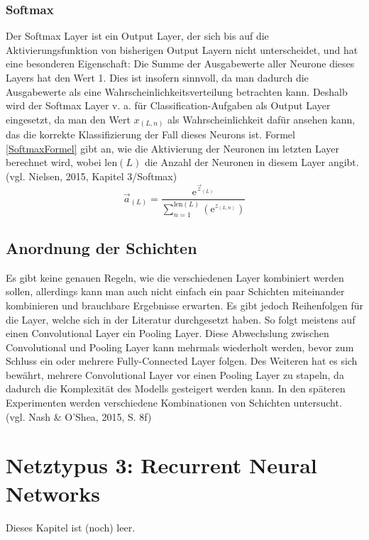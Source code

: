 \documentclass[a4paper,12pt,ngerman,oneside]{scrreprt}	%
\newcommand{\cnnKlein}[1]{(vgl. Nash \& O'Shea, 2015, S. {#1})}
\begin{document}
			\subsection{Softmax}
			Der Softmax Layer ist ein Output Layer, der sich bis auf die Aktivierungsfunktion von bisherigen Output Layern nicht unterscheidet, und hat eine besonderen Eigenschaft: Die Summe der Ausgabewerte aller Neurone dieses Layers hat den Wert 1. Dies ist insofern sinnvoll, da man dadurch die Ausgabewerte als eine Wahrscheinlichkeitsverteilung betrachten kann. Deshalb wird der Softmax Layer v. a. für Classification-Aufgaben als Output Layer eingesetzt, da man den Wert $x_{(L,n)}$ als Wahrscheinlichkeit dafür ansehen kann, das die korrekte Klassifizierung der Fall dieses Neurons ist. Formel \ref{SoftmaxFormel} gibt an, wie die Aktivierung der Neuronen im letzten Layer berechnet wird, wobei $\textrm{len}(L)$ die Anzahl der Neuronen in diesem Layer angibt. (vgl. Nielsen, 2015, Kapitel 3/Softmax)
			\begin{equation}\label{SoftmaxFormel}
				\vec{a}_{(L)} = \frac{ \textrm{e}^{ \vec{z}_{(L)} } }{ \sum\limits_{ n=1 }^{ \textrm{len}(L) } \left( \textrm{e}^{ z_{ (L,n) } } \right)} 
			\end{equation}
			
		\section{Anordnung der Schichten}
		Es gibt keine genauen Regeln, wie die verschiedenen Layer kombiniert werden sollen, allerdings kann man auch nicht einfach ein paar Schichten miteinander kombinieren und brauchbare Ergebnisse erwarten. Es gibt jedoch Reihenfolgen für die Layer, welche sich in der Literatur durchgesetzt haben. So folgt meistens auf einen Convolutional Layer ein Pooling Layer. Diese Abwechslung zwischen Convolutional und Pooling Layer kann mehrmals wiederholt werden, bevor zum Schluss ein oder mehrere Fully-Connected Layer folgen. Des Weiteren hat es sich bewährt, mehrere Convolutional Layer vor einen Pooling Layer zu stapeln, da dadurch die Komplexität des Modells gesteigert werden kann. In den späteren Experimenten werden verschiedene Kombinationen von Schichten untersucht. \cnnKlein{8f}
	
	\chapter{Netztypus 3: Recurrent Neural Networks}\label{KapitelRNN}
	Dieses Kapitel ist (noch) leer.
\end{document}
